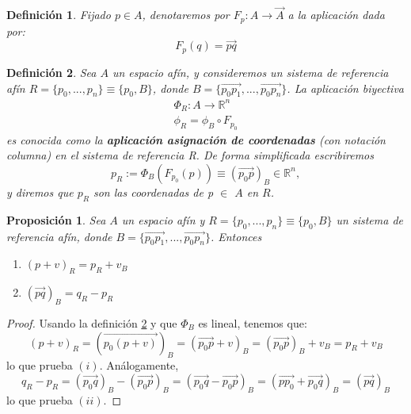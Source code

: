 \documentclass[a4paper,11pt, oneside]{book}
\newtheorem{defi}{Definición}
\newtheorem{prop}{Proposición}
\begin{document}
\begin{defi}
	Fijado $p \in A$, denotaremos por $F_p: A \rightarrow \overrightarrow{A}$ a la aplicación dada por:
	\begin{equation}
		F_p(q) = \overrightarrow{pq}
	\end{equation}
\end{defi}
\begin{defi}
	\label{asignacion}
	Sea $A$ un espacio afín, y consideremos un sistema de referencia afín $R = \{p_0,...,p_n\} \equiv \{p_0, B\}$, donde
	$B = \{\overrightarrow{p_0p_1},...,\overrightarrow{p_0p_n}\}$. La aplicación biyectiva
	\begin{equation}
	\begin{split}
	\Phi_R : A \rightarrow \mathbb R^n \\
	 \phi_R = \phi_B \circ F_{p_0}
	\end{split}
	\end{equation}
	es conocida como la \textbf{aplicación asignación de coordenadas} (con notación columna) en el sistema de referencia R. De forma simplificada escribiremos
	\begin{equation}
	p_R := \Phi_B(F_{p_0}(p)) \equiv (\overrightarrow{p_0p})_B \in \mathbb R^n, 
	\end{equation}
	y diremos que $p_R$ son las coordenadas de p $\in$ $A$ en $R$.
\end{defi}
\begin{prop}
	\label{aux}
	Sea $A$ un espacio afín y $R = \{p_0,...,p_n\} \equiv \{p_0,B\}$ un sistema de referencia afín, donde $B = \{\overrightarrow{p_0p_1},...,\overrightarrow{p_0p_n}\}$. Entonces
	\begin{enumerate}
		\item $(p+v)_R = p_R + v_B$
		\item $(\overrightarrow{pq})_B = q_R - p_R$
	\end{enumerate}
\end{prop}
\begin{proof}
	Usando la definición \ref{asignacion} y que $\Phi_B$ es lineal, tenemos que:
	\begin{equation}
	(p+v)_R = (\overrightarrow{p_0(p+v)})_B = (\overrightarrow{p_0p}+v)_B = (\overrightarrow{p_0p})_B +v_B = p_R +v_B
	\end{equation}
	lo que prueba $(i)$. Análogamente,
	\begin{equation}
	q_R - p_R = (\overrightarrow{p_0q})_B - (\overrightarrow{p_0p})_B = (\overrightarrow{p_0q} - \overrightarrow{p_0p})_B = (\overrightarrow{pp_0}+\overrightarrow{p_0q})_B = (\overrightarrow{pq})_B
	\end{equation}
	lo que prueba $(ii)$.
\end{proof}
\end{document}
